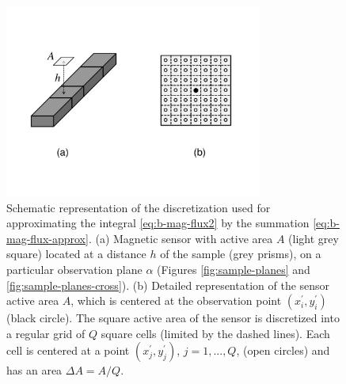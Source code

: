 \documentclass[galley,gc]{agutex}
\begin{document}
 \begin{figure}
 \noindent \includegraphics[width=20pc]{Figs/Fig4b_HQ.pdf}
 \caption{Schematic representation of the discretization
 used for approximating the integral \ref{eq:b-mag-flux2} by 
 the summation \ref{eq:b-mag-flux-approx}.
 (a) Magnetic sensor with active area $A$ (light grey square) located at
 a distance $h$ of the sample (grey prisms), on a particular observation
 plane $\alpha$ (Figures \ref{fig:sample-planes} and 
 \ref{fig:sample-planes-cross}). (b) Detailed representation
 of the sensor active area $A$, which is centered at the observation point
 $(x^{\prime}_{i}, y^{\prime}_{i})$ (black circle). The square active area 
 of the sensor is discretized into a regular grid of $Q$ square cells 
 (limited by the dashed lines). Each cell is centered at a point 
 $(x^{\prime}_{j}, y^{\prime}_{j})$, $j = 1, ..., Q$, (open circles) and 
 has an area $\Delta A = A/Q$.}
 \label{fig:b-mag-flux-approx}
 \end{figure} 
 
\end{document}
